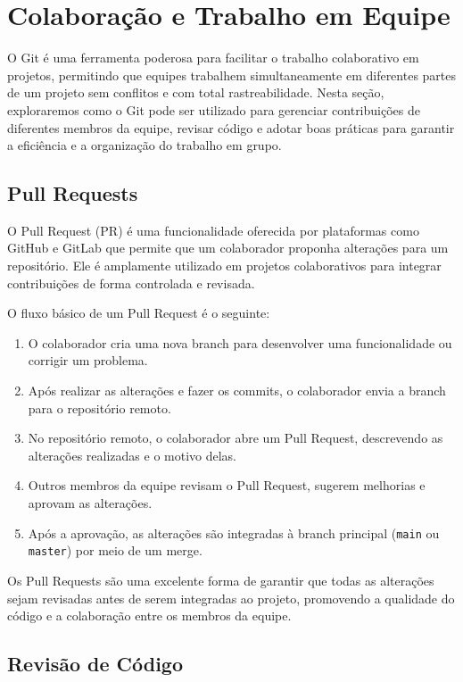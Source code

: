 \newpage
\section{Colaboração e Trabalho em Equipe}

O Git é uma ferramenta poderosa para facilitar o trabalho colaborativo em projetos, permitindo que equipes trabalhem simultaneamente em diferentes partes de um projeto sem conflitos e com total rastreabilidade. Nesta seção, exploraremos como o Git pode ser utilizado para gerenciar contribuições de diferentes membros da equipe, revisar código e adotar boas práticas para garantir a eficiência e a organização do trabalho em grupo.

\subsection{Pull Requests}

O Pull Request (PR) é uma funcionalidade oferecida por plataformas como GitHub e GitLab que permite que um colaborador proponha alterações para um repositório. Ele é amplamente utilizado em projetos colaborativos para integrar contribuições de forma controlada e revisada.

O fluxo básico de um Pull Request é o seguinte:
\begin{enumerate}
    \item O colaborador cria uma nova branch para desenvolver uma funcionalidade ou corrigir um problema.
    \item Após realizar as alterações e fazer os commits, o colaborador envia a branch para o repositório remoto.
    \item No repositório remoto, o colaborador abre um Pull Request, descrevendo as alterações realizadas e o motivo delas.
    \item Outros membros da equipe revisam o Pull Request, sugerem melhorias e aprovam as alterações.
    \item Após a aprovação, as alterações são integradas à branch principal (\texttt{main} ou \texttt{master}) por meio de um merge.
\end{enumerate}

Os Pull Requests são uma excelente forma de garantir que todas as alterações sejam revisadas antes de serem integradas ao projeto, promovendo a qualidade do código e a colaboração entre os membros da equipe.

\subsection{Revisão de Código}

